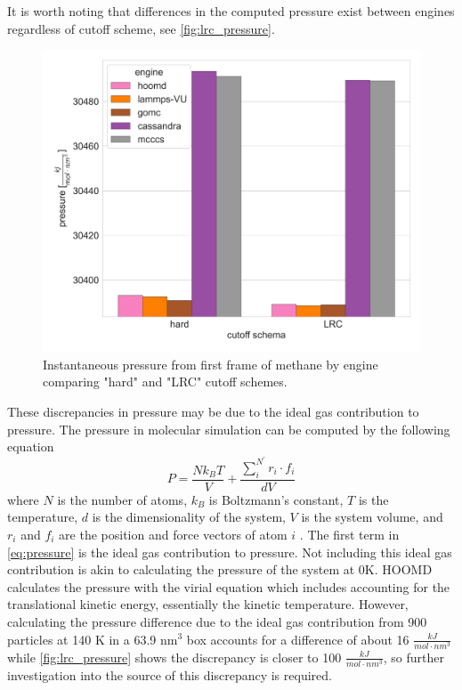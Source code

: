 It is worth noting that differences in the computed pressure exist between engines regardless of cutoff scheme, see \autoref{fig:lrc_pressure}.
\begin{figure}[h!]
    \centering
    \includegraphics[width=0.6\linewidth,keepaspectratio]{figures/rep_study/lrc_pressure.png}
    \caption{Instantaneous pressure from first frame of methane by engine comparing "hard" and "LRC" cutoff schemes.}\label{fig:lrc_pressure}
\end{figure}
These discrepancies in pressure may be due to the ideal gas contribution to pressure. 
The pressure in molecular simulation can be computed by the following equation
\begin{equation}\label{eq:pressure}
    P = \frac{N k_{B} T}{V} + \frac{\sum_{i}^{N^{'}} r_{i} \cdot f_{i}}{dV}
\end{equation}
where $N$ is the number of atoms, $k_{B}$ is Boltzmann's constant, $T$ is the temperature, $d$ is the dimensionality of the system, $V$ is the system volume, and $r_i$ and $f_i$ are the position and force vectors of atom $i$ \citep{Thompson2009}.
The first term in \autoref{eq:pressure} is the ideal gas contribution to pressure.
Not including this ideal gas contribution is akin to calculating the pressure of the system at 0K.
HOOMD calculates the pressure with the virial equation which includes accounting for the translational kinetic energy, essentially the kinetic temperature.
However, calculating the pressure difference due to the ideal gas contribution from 900 particles at 140 K in a 63.9 nm$^3$ box accounts for a difference of about 16 $\frac{kJ}{mol \cdot nm^{3}}$ while \autoref{fig:lrc_pressure} shows the discrepancy is closer to 100 $\frac{kJ}{mol \cdot nm^{3}}$, so further investigation into the source of this discrepancy is required.

